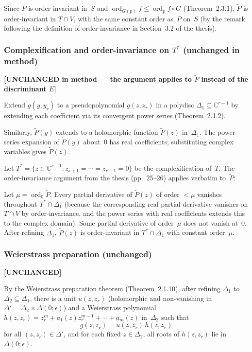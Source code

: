\documentclass[11pt]{article}
\theoremstyle{plain}
\theoremstyle{definition}
\newcommand{\C}{\mathbb{C}}
\DeclareMathOperator{\ord}{ord}
\begin{document}
Since $P$ is order-invariant in~$S$ and $\ord_{G(p)} f \le \ord_p f \circ G$
(Theorem~2.3.1), $\widetilde{P}$ is order-invariant in $T \cap V$, with the
same constant order as~$P$ on~$S$ (by the remark following the definition
of order-invariance in Section~3.2 of the thesis).

\subsubsection{Complexification and order-invariance on
\texorpdfstring{$T^*$}{T*} (unchanged in method)}
\label{sssec:complexification}

\textbf{[UNCHANGED in method --- the argument applies to $\widetilde{P}$
instead of the discriminant $E$]}

Extend $g(y, y_r)$ to a pseudopolynomial $g(z, z_r)$ in a polydisc
$\Delta_1 \subseteq \C^{r-1}$ by extending each coefficient via its
convergent power series (Theorem~2.1.2).

Similarly, $\widetilde{P}(y)$ extends to a holomorphic function
$\widetilde{P}(z)$ in~$\Delta_1$.  The power series expansion of
$\widetilde{P}(y)$ about~$0$ has real coefficients; substituting complex
variables gives $\widetilde{P}(z)$.

Let $T^* = \{ z \in \C^{r-1} : z_{s+1} = \cdots = z_{r-1} = 0 \}$ be the
complexification of~$T$.  The order-invariance argument from the thesis
(pp.~25--26) applies verbatim to~$\widetilde{P}$:

Let $\mu = \ord_0 \widetilde{P}$.  Every partial derivative of
$\widetilde{P}(z)$ of order $< \mu$ vanishes throughout
$T^* \cap \Delta_1$ (because the corresponding real partial derivative
vanishes on $T \cap V$ by order-invariance, and the power series with
real coefficients extends this to the complex domain).  Some partial
derivative of order~$\mu$ does not vanish at~$0$.  After refining
$\Delta_1$, $\widetilde{P}(z)$ is order-invariant in $T^* \cap \Delta_1$
with constant order~$\mu$.

\subsubsection{Weierstrass preparation (unchanged)}
\label{sssec:weierstrass}

\textbf{[UNCHANGED]}

By the Weierstrass preparation theorem (Theorem~2.1.10), after refining
$\Delta_1$ to $\Delta_2 \subseteq \Delta_1$, there is a unit
$u(z, z_r)$ (holomorphic and non-vanishing in
$\Delta' = \Delta_2 \times \Delta(0; \epsilon)$) and a Weierstrass
polynomial
$h(z, z_r) = z_r^m + a_1(z) z_r^{m-1} + \cdots + a_m(z)$
in~$\Delta_2$ such that
\begin{equation}
  g(z, z_r) = u(z, z_r) \, h(z, z_r)
  \tag{3.3.7}
\end{equation}
for all $(z, z_r) \in \Delta'$, and for each fixed $z \in \Delta_2$,
all roots of $h(z, z_r)$ lie in $\Delta(0; \epsilon)$.
\end{document}
